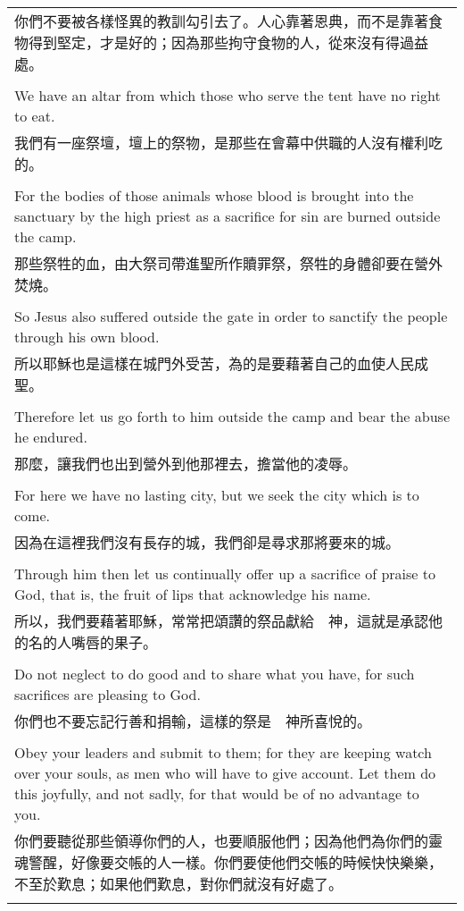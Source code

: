 \begin{tabularx}{\textwidth}{p{}}
你們不要被各樣怪異的教訓勾引去了。人心靠著恩典，而不是靠著食物得到堅定，才是好的；因為那些拘守食物的人，從來沒有得過益處。 \\ \\
We have an altar from which those who serve the tent have no right to eat. \\
我們有一座祭壇，壇上的祭物，是那些在會幕中供職的人沒有權利吃的。 \\ \\
For the bodies of those animals whose blood is brought into the sanctuary by the high priest as a sacrifice for sin are burned outside the camp. \\
那些祭牲的血，由大祭司帶進聖所作贖罪祭，祭牲的身體卻要在營外焚燒。 \\ \\
So Jesus also suffered outside the gate in order to sanctify the people through his own blood. \\
所以耶穌也是這樣在城門外受苦，為的是要藉著自己的血使人民成聖。 \\ \\
Therefore let us go forth to him outside the camp and bear the abuse he endured. \\
那麼，讓我們也出到營外到他那裡去，擔當他的凌辱。 \\ \\
For here we have no lasting city, but we seek the city which is to come. \\
因為在這裡我們沒有長存的城，我們卻是尋求那將要來的城。 \\ \\
Through him then let us continually offer up a sacrifice of praise to God, that is, the fruit of lips that acknowledge his name. \\
所以，我們要藉著耶穌，常常把頌讚的祭品獻給　神，這就是承認他的名的人嘴唇的果子。 \\ \\
Do not neglect to do good and to share what you have, for such sacrifices are pleasing to God. \\
你們也不要忘記行善和捐輸，這樣的祭是　神所喜悅的。 \\ \\
Obey your leaders and submit to them; for they are keeping watch over your souls, as men who will have to give account. Let them do this joyfully, and not sadly, for that would be of no advantage to you. \\
你們要聽從那些領導你們的人，也要順服他們；因為他們為你們的靈魂警醒，好像要交帳的人一樣。你們要使他們交帳的時候快快樂樂，不至於歎息；如果他們歎息，對你們就沒有好處了。 \\ \\

\hline
\end{tabularx}

